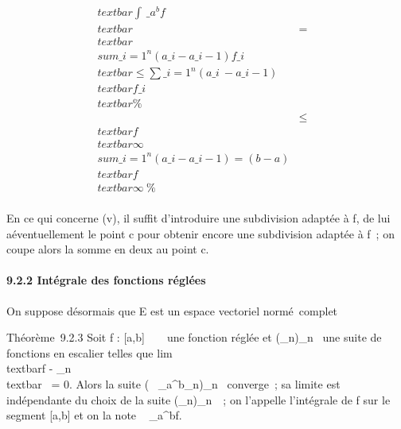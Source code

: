 \documentclass[]{article}
\begin{document}
\begin{align*}
\\textbar{}\int ~
\_a^bf\\textbar{}& =&
\\textbar{}\\sum
\_i=1^n(a\_ i -
a\_i-1)f\_i\\textbar{}
\leq\sum \_i=1^n(a\_ i~ -
a\_i-1)\\textbar{}f\_i\\textbar{}\%&
\\ & \leq&
\\textbar{}f\\textbar{}\infty~\\sum
\_i=1^n(a\_ i - a\_i-1) = (b -
a)\\textbar{}f\\textbar{}\infty~ \%&
\\ \end{align*}

En ce qui concerne (v), il suffit d'introduire une subdivision \sigma adaptée
à f, de lui a\jmathouter éventuellement le point c pour obtenir encore une
subdivision adaptée à f~; on coupe alors la somme en deux au point c.

\paragraph{9.2.2 Intégrale des fonctions réglées}

On suppose désormais que E est un espace vectoriel normé~complet

Théorème~9.2.3 Soit f : {[}a,b{]} \rightarrow~ ~ une fonction réglée et
(\phi\_n)\_n\in{}~ une suite de fonctions en escalier telles
que lim~\\textbar{}f -
\phi\_n\\textbar{}\infty~ = 0. Alors la suite
\left (\int ~
\_a^b\phi\_n\right )\_n\in{}~
converge~; sa limite est indépendante du choix de la suite
(\phi\_n)\_n\in{}~~; on l'appelle l'intégrale de f sur le
segment {[}a,b{]} et on la note \int ~
\_a^bf.
\end{document}
